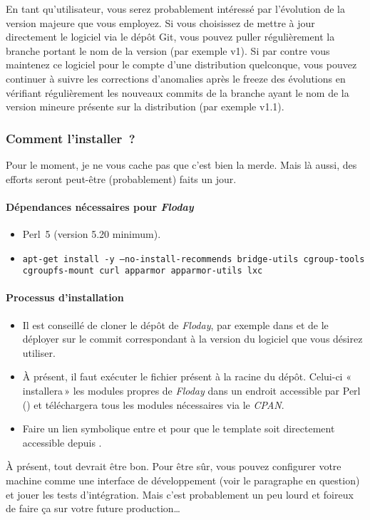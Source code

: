 En tant qu'utilisateur, vous serez probablement intéressé par l'évolution de la version majeure que vous employez. Si vous choisissez de mettre à jour directement le logiciel via le dépôt Git, vous pouvez puller régulièrement la branche portant le nom de la version (par exemple v1).
Si par contre vous maintenez ce logiciel pour le compte d'une distribution quelconque, vous pouvez continuer à suivre les corrections d'anomalies après le freeze des évolutions en vérifiant régulièrement les nouveaux commits de la branche ayant le nom de la version mineure présente sur la distribution (par exemple v1.1).

\subsubsection{Comment l'installer~?}

Pour le moment, je ne vous cache pas que c'est bien la merde.
Mais là aussi, des efforts seront peut-être (probablement) faits un jour.

\paragraph{Dépendances nécessaires pour \emph{Floday}}
\begin{itemize}
	\item Perl~5 (version 5.20 minimum).
	\item \texttt{apt-get install -y --no-install-recommends bridge-utils cgroup-tools\\cgroupfs-mount curl apparmor apparmor-utils lxc}
\end{itemize}

\paragraph{Processus d'installation}

\begin{itemize}
	\item Il est conseillé de cloner le dépôt de \emph{Floday}, par exemple dans  et de le déployer sur le commit correspondant à la version du logiciel que vous désirez utiliser.
	\item À présent, il faut exécuter le fichier  présent à la racine du dépôt.
		Celui-ci «\,installera\,» les modules propres de \emph{Floday} dans un endroit accessible par Perl () et téléchargera tous les modules nécessaires via le \emph{CPAN}.
	\item Faire un lien symbolique entre  et  pour que le template soit directement accessible depuis .
\end{itemize}

À présent, tout devrait être bon. Pour être sûr, vous pouvez configurer votre machine comme une interface de développement (voir le paragraphe en question) et jouer les tests d'intégration.
Mais c'est probablement un peu lourd et foireux de faire ça sur votre future production\dots
